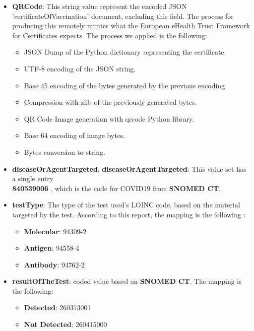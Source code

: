 \documentclass{article}[IEEEtran]
\begin{document}
    \begin{itemize}
        \item \textbf{QRCode}: This string value represent the encoded JSON 'certificateOfVaccination' document, excluding this field. The process for producing this remotely mimics what the European eHealth Trust Framework for Certificates expects. The process we applied is the following:
        
        \begin{itemize}
            \item JSON Dump of the Python dictionary representing the certificate.
            \item UTF-8 encoding of the JSON string.
            \item Base 45 encoding of the bytes generated by the previous encoding.
            \item Compression with zlib of the previously generated bytes.
            \item QR Code Image generation with qrcode Python library.
            \item Base 64 encoding of image bytes.
            \item Bytes conversion to string.
        \end{itemize}
        
        \item \textbf{diseaseOrAgentTargeted}: \textbf{diseaseOrAgentTargeted}: This value set has a single entry \\ \textbf{840539006} , which is the code for COVID19 from \textbf{SNOMED CT}.
        
        \item \textbf{testType}:  The type of the test used's LOINC code, based on the material targeted by the test. According to this report, the mapping is the following :
        
        \begin{itemize}
            \item \textbf{Molecular}: 94309-2
            \item \textbf{Antigen}: 94558-4
            \item \textbf{Antibody}: 94762-2
        \end{itemize}
        
        \item \textbf{resultOfTheTest}: coded value based on \textbf{SNOMED CT}. The mapping is the following:
        \begin{itemize}
            \item \textbf{Detected}: 260373001
            \item \textbf{Not Detected}: 260415000
        \end{itemize}
        

\end{itemize}
\end{document}
